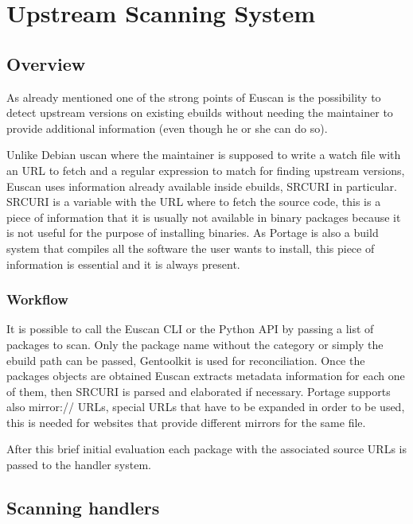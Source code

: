 \chapter{Upstream Scanning System}

\section{Overview}
As already mentioned one of the strong points of Euscan is the possibility to detect upstream versions on existing ebuilds without needing the maintainer to provide additional information (even though he or she can do so).

Unlike Debian uscan where the maintainer is supposed to write a watch file with an URL to fetch and a regular expression to match for finding upstream versions, Euscan uses information already available inside ebuilds, SRC\textunderscore URI in particular. SRC\textunderscore URI is a variable with the URL where to fetch the source code, this is a piece of information that it is usually not available in binary packages because it is not useful for the purpose of installing binaries. As Portage is also a build system that compiles all the software the user wants to install, this piece of information is essential and it is always present.

\subsection{Workflow}
It is possible to call the Euscan CLI or the Python API by passing a list of packages to scan. Only the package name without the category or simply the ebuild path can be passed, Gentoolkit is used for reconciliation. Once the packages objects are obtained Euscan extracts metadata information for each one of them, then SRC\textunderscore URI is parsed and elaborated if necessary. Portage supports also mirror:// URLs, special URLs that have to be expanded in order to be used, this is needed for websites that provide different mirrors for the same file.

After this brief initial evaluation each package with the associated source URLs is passed to the handler system.


\section{Scanning handlers}
\label{sec:handlers}

